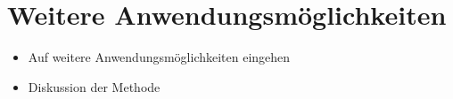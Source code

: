 %
%
%
%

\section{Weitere Anwendungsmöglichkeiten\label{neuronal:section:weiteres}}

\begin{itemize}
    \item Auf weitere Anwendungsmöglichkeiten eingehen
    \item Diskussion der Methode
\end{itemize}